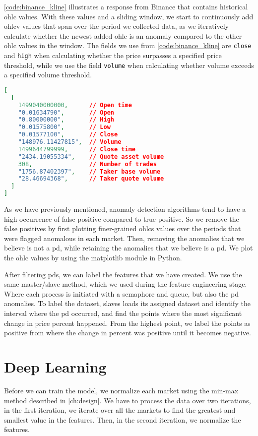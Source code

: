 \autoref{code:binance_kline} illustrates a response from Binance that contains historical \ac{ohlc} values. With these values and a sliding window, we start to continuously add \ac{ohlcv} values that span over the period we collected data, as we iteratively calculate whether the newest added \ac{ohlc} is an anomaly compared to the other \ac{ohlc} values in the window. The fields we use from \autoref{code:binance_kline} are \texttt{close} and \texttt{high} when calculating whether the price surpasses a specified price threshold, while we use the field \texttt{volume} when calculating whether volume exceeds a specified volume threshold.

\begin{lstlisting}[language=json, caption={Historical kline response from Binance (Source \cite{binance_git})}, label=code:binance_kline]
[
  [
    1499040000000,      // Open time
    "0.01634790",       // Open
    "0.80000000",       // High
    "0.01575800",       // Low
    "0.01577100",       // Close
    "148976.11427815",  // Volume
    1499644799999,      // Close time
    "2434.19055334",    // Quote asset volume
    308,                // Number of trades
    "1756.87402397",    // Taker base volume
    "28.46694368",      // Taker quote volume
  ]
]
\end{lstlisting}

As we have previously mentioned,  anomaly detection algorithms tend to have a high occurrence of false positive compared to true positive. So we remove the false positives by first plotting finer-grained \acp{ohlc} values over the periods that were flagged anomalous in each market. Then, removing the anomalies that we believe is not a \ac{pd}, while retaining the anomalies that we believe is a \ac{pd}. We plot the \ac{ohlc} values by using the matplotlib module in Python.

After filtering \acp{pd}, we can label the features that we have created. We use the same master/slave method, which we used during the feature engineering stage. Where each process is initiated with a semaphore and queue, but also the \ac{pd} anomalies. To label the dataset, slaves loads its assigned dataset and identify the interval where the \ac{pd} occurred, and find the points where the most significant change in price percent happened. From the highest point, we label the points as positive from where the change in percent was positive until it becomes negative.

\section{Deep Learning}
Before we can train the model, we normalize each market using the min-max method described in \autoref{ch:design}. We have to process the data over two iterations, in the first iteration, we iterate over all the markets to find the greatest and smallest value in the features. Then, in the second iteration, we normalize the features.

